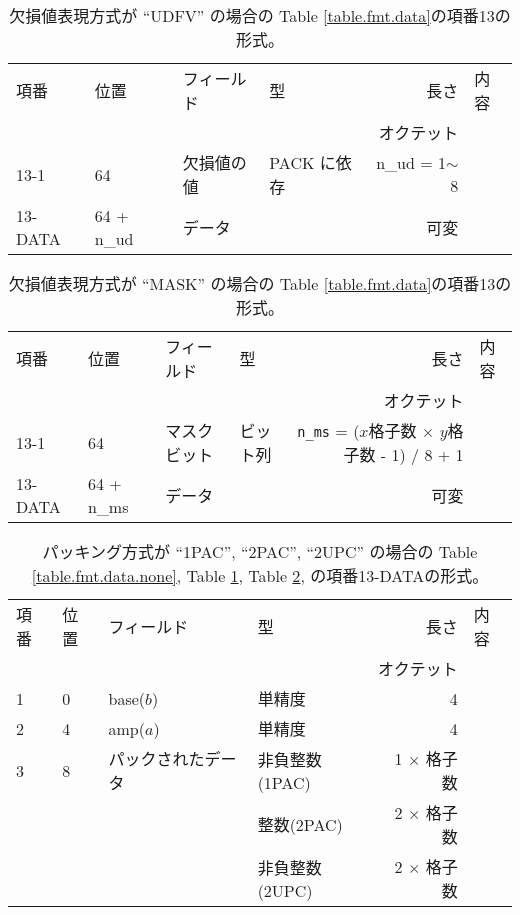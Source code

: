 \begin{table}[htp]
 \begin{center}
 \begin{tabular}{ll|llrl}
 \hline
 項番 & 位置 & フィールド & 型 & 長さ & 内容 \\
      &      &            & \multicolumn{2}{r}{オクテット} &  \\
 \hline
 13-1 &  64  & 欠損値の値 & PACK に依存 & n\_ud = 1$\sim$8 & \\
 13-DATA & 64 + n\_ud & データ &   & 可変 & \\ \hline
 \end{tabular}
 \end{center}
 \caption{%
  欠損値表現方式が ``UDFV'' の場合の Table \ref{table.fmt.data}の項番13の形式。
 }
 \label{table.fmt.data.udfv}
\end{table}

\begin{table}[htp]
 \begin{center}
 \begin{tabular}{ll|llrl}
 \hline
 項番 & 位置 & フィールド & 型 & 長さ & 内容 \\
      &      &            & \multicolumn{2}{r}{オクテット} &  \\
 \hline
 13-1 &  64  & マスクビット & ビット列
      & {\tt n\_ms} = ($x$格子数 $\times$ $y$格子数 - 1) / 8 + 1\\
 13-DATA & 64 + n\_ms & データ     &  & 可変 \\ \hline
 \end{tabular}
 \end{center}
 \caption{%
  欠損値表現方式が ``MASK'' の場合の
 Table \ref{table.fmt.data}の項番13の形式。
 }
 \label{table.fmt.data.mask}
\end{table}

\begin{table}[htp]
 \begin{center}
 \begin{tabular}{ll|llrl}
 \hline
 項番 & 位置 & フィールド & 型 & 長さ & 内容 \\
      &      &            & \multicolumn{2}{r}{オクテット} &  \\
 \hline
   1  &  0   & base($b$) & 単精度 & 4 &  \\
   2  &  4   & amp($a$)  & 単精度 & 4 &  \\
   3  &  8   & パックされたデータ & 非負整数(1PAC) & 1 $\times$ 格子数 &
  \\ 
      &      &                    & 整数(2PAC) & 2 $\times$ 格子数 & \\ 
      &      &                    & 非負整数(2UPC) & 2 $\times$ 格子数 &
  \\ 
  \hline
 \end{tabular}
 \end{center}
 \caption{%
  パッキング方式が ``1PAC'', ``2PAC'', ``2UPC'' の場合の
 Table \ref{table.fmt.data.none},
 Table \ref{table.fmt.data.udfv},
 Table \ref{table.fmt.data.mask}, の項番13-DATAの形式。
 }
 \label{table.fmt.data.2pac}
\end{table}

